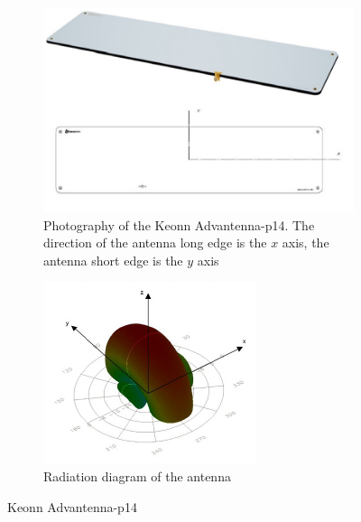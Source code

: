 \begin{figure}
    \centering
    \begin{subfigure}{.45\textwidth}
        \centering
        \includegraphics[width=\linewidth]{./figs/advantennap14.pdf}
        \caption{Photography of the Keonn Advantenna-p14. The direction of the antenna long edge is the $x$ axis, the antenna short edge is the $y$ axis} 
        \label{fig:advantennap14}
    \end{subfigure}
    \begin{subfigure}{.45\textwidth}
        \centering
        \includegraphics[width=\linewidth]{./figs/advantennap14-radiation.pdf}
        \caption{Radiation diagram of the antenna} 
        \label{fig:advantennap14-radiation}
    \end{subfigure}
    \caption[Keonn Advantenna-p14]{Keonn Advantenna-p14~\cite{Advantennap14RFIDCompact}} 
    \label{fig:antennachoice}
\end{figure}

